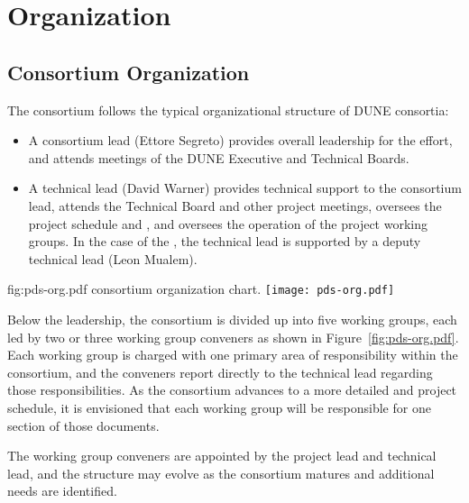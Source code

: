 \section{Organization}
\label{sec:fdsp-pd-org}

\subsection{Consortium Organization}
\label{sec:fdsp-pd-org-consortium}


The \single {} consortium follows the typical organizational structure of DUNE consortia:
\begin{itemize}
\item A consortium lead (Ettore Segreto) provides overall leadership for the effort, and attends meetings of the DUNE Executive and Technical Boards.
\item A technical lead (David Warner) provides technical support to the consortium lead, attends the Technical Board and other project meetings, oversees the project schedule and , and oversees the operation of the project working groups.  In the case of the , the technical lead is supported by a deputy technical lead (Leon Mualem).
\end{itemize}

\begin{dunefigure}{fig:pds-org.pdf}
{ consortium organization chart.}
 \texttt{[image: pds-org.pdf]}
\end{dunefigure}

Below the leadership, the consortium is divided up into five working groups, each led by two or three working group conveners as shown in Figure~\ref{fig:pds-org.pdf}. %
Each working group is charged with one primary area of responsibility within the consortium, and the conveners report directly to the technical lead regarding those responsibilities.  As the consortium advances to a more detailed  and project schedule, it is envisioned that each working group will be responsible for one section of those documents.

The working group conveners are appointed by the  project lead and technical lead, and the structure may evolve as the consortium matures and additional needs are identified. 

